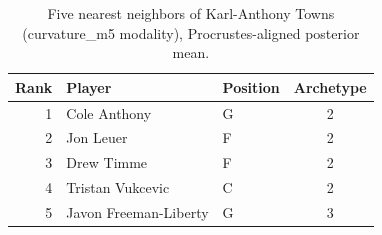 \begin{table}[htbp]
  \centering\small
  \begin{tabular}{rllc}
    \toprule
    Rank & Player & Position & Archetype \\
    \midrule
    1 & Cole Anthony & G & 2 \\
    2 & Jon Leuer & F & 2 \\
    3 & Drew Timme & F & 2 \\
    4 & Tristan Vukcevic & C & 2 \\
    5 & Javon Freeman-Liberty & G & 3 \\
    \bottomrule
  \end{tabular}
  \caption{Five nearest neighbors of Karl-Anthony Towns (curvature_m5 modality), Procrustes-aligned posterior mean.}
  \label{tab:Karl_Anthony_Towns_neighbors_curvature_m5}
\end{table}

